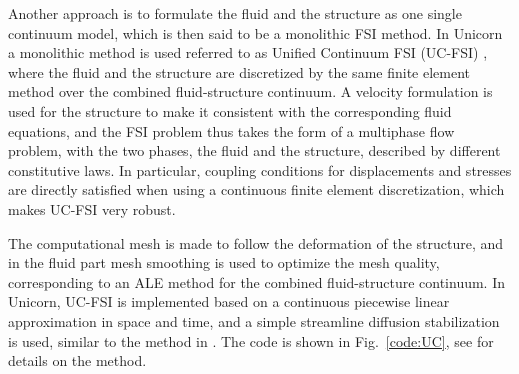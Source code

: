 Another approach is to formulate the fluid and the structure as one single continuum model, which is then said to be a monolithic FSI method. In Unicorn a monolithic method is used referred to as Unified Continuum FSI (UC-FSI) \cite{HoffmanJanssonEtAl2009}, where the fluid and the structure are discretized by the same finite element method over the combined fluid-structure continuum. A velocity formulation is used for the structure to make it consistent with the corresponding fluid equations, and the FSI problem thus takes the form of a multiphase flow problem, with the two phases, the fluid and the structure, described by different constitutive laws. In particular, coupling conditions for displacements and stresses are directly satisfied when using a continuous finite element discretization, which makes UC-FSI very robust. 

The computational mesh is made to follow the deformation of the structure, and in the fluid part mesh smoothing is used to optimize the mesh quality, corresponding to an ALE method for the combined fluid-structure continuum. 
In Unicorn, UC-FSI is implemented based on a continuous piecewise linear approximation in space and time, and a simple streamline diffusion stabilization is used, similar to the method in \cite{Hansbo2000}. 
The code is shown in Fig.~\ref{code:UC}, see \cite{HoffmanJanssonEtAl2009} for details on the method. 

